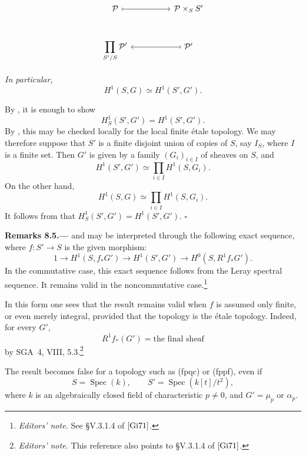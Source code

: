 \[
\begin{tikzcd}[column sep=huge,row sep=large]
\mathcal P
  \arrow[r,mapsto]
&
\mathcal P\times_S S'
\\
\displaystyle\prod_{S'/S}\mathcal P'
&
\mathcal P'
  \arrow[l,mapsto]
\end{tikzcd}


\]

\emph{In particular,
\[
  H^1(S,G)\simeq H^1(S',G').
\]}

By , it is enough to show
\[
  H^1_S(S',G')=H^1(S',G').
\]
By , this may be checked locally for the local finite étale
topology. We may therefore suppose that \(S'\) is a finite disjoint
union of copies of \(S\), say \(I_S\), where \(I\) is a finite set.
Then \(G'\) is given by a family \((G_i)_{i\in I}\) of sheaves on
\(S\), and
\[
  H^1(S',G')
  \simeq
  \prod_{i\in I}H^1(S,G_i).
\]
On the other hand,
\[
  H^1(S,G)
  \simeq
  \prod_{i\in I}H^1(S,G_i).
\]
It follows from  that
\(H^1_S(S',G')=H^1(S',G')\).
\hfill\(\square\)

\par\medskip\noindent{}\textbf{Remarks 8.5.---}\enspace
{} and  may be interpreted through the following
exact sequence, where \(f:S'\to S\) is the given morphism:
\[
  1\longrightarrow H^1(S,f_*G')
  \longrightarrow H^1(S',G')
  \longrightarrow H^0(S,R^1f_*G').
\]
In the commutative case, this exact sequence follows from the Leray
spectral sequence. It remains valid in the noncommutative
case.\footnote{\textit{Editors' note.} See \S V.3.1.4 of
\([{\rm Gi71}]\).}

In this form one sees that the result remains valid when \(f\) is
assumed only finite, or even merely integral, provided that the
topology is the étale topology. Indeed, for every \(G'\),
\[
  R^1f_*(G')=\text{the final sheaf}
\]
by SGA~4, VIII, 5.3.\footnote{\textit{Editors' note.} This reference
also points to \S V.3.1.4 of \([{\rm Gi71}]\).}

The result becomes false for a topology such as \textup{(fpqc)} or
\textup{(fppf)}, even if
\[
  S=\operatorname{Spec}(k),
  \qquad
  S'=\operatorname{Spec}(k[t]/t^2),
\]
where \(k\) is an algebraically closed field of characteristic
\(p\neq0\), and \(G'=\mu_p\) or \(\alpha_p\).

